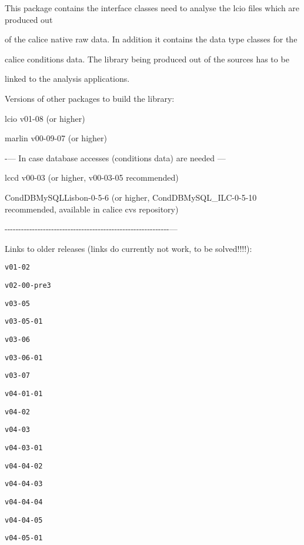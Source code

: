 This package contains the interface classes need to analyse the lcio files which are produced out\par
 of the calice native raw data. In addition it contains the data type classes for the \par
 calice conditions data. The library being produced out of the sources has to be\par
 linked to the analysis applications. \par
 Versions of other packages to build the library\-:\par
 \par
 lcio v01-\/08 (or higher)\par
 marlin v00-\/09-\/07 (or higher)\par
 -\/--- In case database accesses (conditions data) are needed ---\par
 lccd v00-\/03 (or higher, v00-\/03-\/05 recommended)\par
 Cond\-D\-B\-My\-S\-Q\-L\-Lisbon-\/0-\/5-\/6 (or higher, Cond\-D\-B\-My\-S\-Q\-L\-\_\-\-I\-L\-C-\/0-\/5-\/10 recommended, available in calice cvs repository)\par
 -\/-\/-\/-\/-\/-\/-\/-\/-\/-\/-\/-\/-\/-\/-\/-\/-\/-\/-\/-\/-\/-\/-\/-\/-\/-\/-\/-\/-\/-\/-\/-\/-\/-\/-\/-\/-\/-\/-\/-\/-\/-\/-\/-\/-\/-\/-\/-\/-\/-\/-\/-\/-\/-\/-\/-\/-\/-\/-\/-\/---\par
 \par
 Links to older releases (links do currently not work, to be solved!!!!)\-:\par
 \par
 {\tt v01-\/02} \par
 {\tt v02-\/00-\/pre3} \par
 {\tt v03-\/05} \par
 {\tt v03-\/05-\/01} \par
 {\tt v03-\/06} \par
 {\tt v03-\/06-\/01} \par
 {\tt v03-\/07} \par
 {\tt v04-\/01-\/01} \par
 {\tt v04-\/02} \par
 {\tt v04-\/03} \par
 {\tt v04-\/03-\/01} \par
 {\tt v04-\/04-\/02} \par
 {\tt v04-\/04-\/03} \par
 {\tt v04-\/04-\/04} \par
 {\tt v04-\/04-\/05} \par
 {\tt v04-\/05-\/01} \par

